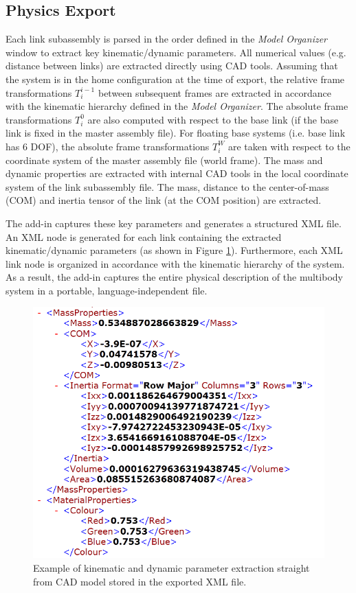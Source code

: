 \subsection{Physics Export} %
\label{sub:physics_export}
Each link subassembly is parsed in the order defined in the \emph{Model Organizer} window to extract key kinematic/dynamic parameters. All numerical values (e.g. distance between links) are extracted directly using CAD tools. Assuming that the system is in the home configuration at the time of export, the relative frame transformations $T^{i-1}_{i}$  between subsequent frames are extracted in accordance with the kinematic hierarchy defined in the \emph{Model Organizer}. The absolute frame transformations $T^{0}_{i}$ are also computed with respect to the base link (if the base link is fixed in the master assembly file). For floating base systems (i.e. base link has 6 DOF), the absolute frame transformations $T^{W}_{i}$ are taken with respect to the coordinate system of the master assembly file (world frame). The mass and dynamic properties are extracted with internal CAD tools in the local coordinate system of the link subassembly file. The mass, distance to the center-of-mass (COM) and inertia tensor of the link (at the COM position) are extracted.

The add-in captures these key parameters and generates a structured XML file. An XML node is generated for each link containing the extracted kinematic/dynamic parameters (as shown in Figure \ref{fig:exportfile}). Furthermore, each XML link node is organized in accordance with the kinematic hierarchy of the system. As a result, the add-in captures the entire physical description of the multibody system in a portable, language-independent file.

\begin{figure}[!h]
	\centering
    \includegraphics[scale=0.6]{fig/toolchain/exportfile.png}
  	\caption{Example of kinematic and dynamic parameter extraction straight from CAD model stored in the exported XML file.}
	\label{fig:exportfile}
\end{figure}

